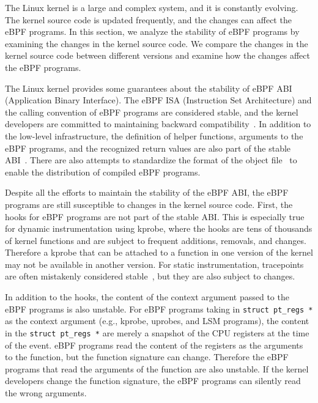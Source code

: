 The Linux kernel is a large and complex system, and it is constantly evolving.
The kernel source code is updated frequently, and the changes can affect the eBPF programs.
In this section, we analyze the stability of eBPF programs by examining the changes in the kernel source code.
We compare the changes in the kernel source code between different versions and examine how the changes affect the eBPF programs.


The Linux kernel provides some guarantees about the stability of eBPF ABI (Application Binary Interface).
The eBPF ISA (Instruction Set Architecture) and the calling convention of eBPF programs are considered stable,
and the kernel developers are committed to maintaining backward compatibility~\cite{bpf-design, bpf-isa}.
In addition to the low-level infrastructure, the definition of helper functions, arguments to the eBPF programs,
and the recognized return values are also part of the stable ABI~\cite{bpf-design}.
There are also attempts to standardize the format of the object file~\cite{bpf-elf} to enable the distribution of compiled eBPF programs.

Despite all the efforts to maintain the stability of the eBPF ABI, the eBPF programs are still susceptible to changes in the kernel source code.
First, the hooks for eBPF programs are not part of the stable ABI.
This is especially true for dynamic instrumentation using kprobe,
where the hooks are tens of thousands of kernel functions and are subject to frequent additions, removals, and changes.
Therefore a kprobe that can be attached to a function in one version of the kernel may not be available in another version.
For static instrumentation, tracepoints are often mistakenly considered stable~\cite{tcp-tracepoint, bpf-book}, but they are also subject to changes.

In addition to the hooks, the content of the context argument passed to the eBPF programs is also unstable.
For eBPF programs taking in \texttt{struct pt\_regs *} as the context argument (e.g., kprobe, uprobes, and LSM programs),
the content in the \texttt{struct pt\_regs *} are merely a snapshot of the CPU registers at the time of the event.
eBPF programs read the content of the registers as the arguments to the function,
but the function signature can change.
Therefore the eBPF programs that read the arguments of the function are also unstable.
If the kernel developers change the function signature, the eBPF programs can silently read the wrong arguments.


